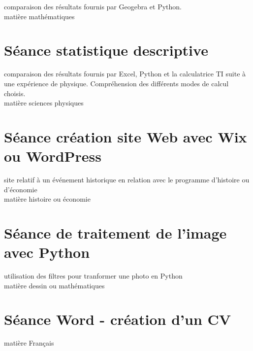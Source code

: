 \documentclass{moncours}
\begin{document}
comparaison des résultats fournis par Geogebra et Python.\\

matière mathématiques

\section{Séance statistique descriptive}

comparaison des résultats fournis par Excel, Python et la calculatrice TI suite à une expérience de physique. Compréhension des différents modes de calcul choisis.\\

matière sciences physiques



\section{Séance création site Web avec Wix ou WordPress}

site relatif à un événement historique en relation avec le programme d'histoire ou d'économie\\

matière histoire ou économie

\section{Séance de traitement de l'image avec Python}

utilisation des filtres pour tranformer une photo en Python\\

 matière dessin ou mathématiques

\section{Séance Word - création d'un CV}

matière Français




\printindex %
\end{document}
